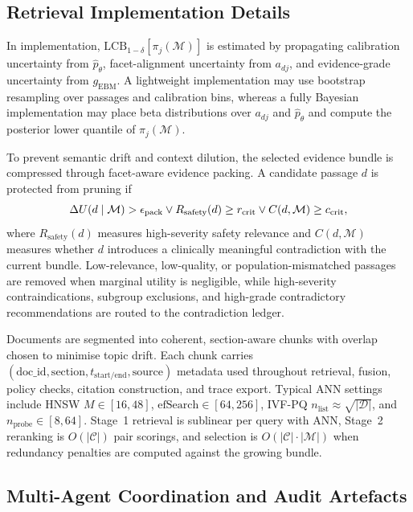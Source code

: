 \documentclass[conference]{IEEEtran}
\begin{document}
\subsection{Retrieval Implementation Details}
\label{app:retrieval-implementation}

In implementation, $\mathrm{LCB}_{1-\delta}[\pi_j(\mathcal{M})]$ is estimated by propagating calibration uncertainty from $\widehat{p}_\theta$, facet-alignment uncertainty from $a_{dj}$, and evidence-grade uncertainty from $g_{\mathrm{EBM}}$. A lightweight implementation may use bootstrap resampling over passages and calibration bins, whereas a fully Bayesian implementation may place beta distributions over $a_{dj}$ and $\widehat{p}_\theta$ and compute the posterior lower quantile of $\pi_j(\mathcal{M})$.

To prevent semantic drift and context dilution, the selected evidence bundle is compressed through facet-aware evidence packing. A candidate passage $d$ is protected from pruning if
\begin{equation}
\scriptsize
\label{eq:protected-pruning}
\small
\Delta U(d\mid\mathcal{M})>\epsilon_{\mathrm{pack}}
\lor
R_{\mathrm{safety}}(d)\ge r_{\mathrm{crit}}
\lor
C(d,\mathcal{M})\ge c_{\mathrm{crit}},
\end{equation}
where $R_{\mathrm{safety}}(d)$ measures high-severity safety relevance and $C(d,\mathcal{M})$ measures whether $d$ introduces a clinically meaningful contradiction with the current bundle. Low-relevance, low-quality, or population-mismatched passages are removed when marginal utility is negligible, while high-severity contraindications, subgroup exclusions, and high-grade contradictory recommendations are routed to the contradiction ledger.

Documents are segmented into coherent, section-aware chunks with overlap chosen to minimise topic drift. Each chunk carries $(\mathrm{doc\_id},\mathrm{section},t_{\mathrm{start/end}},\mathrm{source})$ metadata used throughout retrieval, fusion, policy checks, citation construction, and trace export. Typical ANN settings include HNSW $M\!\in\![16,48]$, $\mathrm{efSearch}\!\in\![64,256]$, IVF-PQ $n_{\mathrm{list}}\!\approx\!\sqrt{|\mathcal{D}|}$, and $n_{\mathrm{probe}}\!\in\![8,64]$. Stage~1 retrieval is sublinear per query with ANN, Stage~2 reranking is $O(|\mathcal{C}|)$ pair scorings, and selection is $O(|\mathcal{C}|\cdot|\mathcal{M}|)$ when redundancy penalties are computed against the growing bundle.


\subsection{Multi-Agent Coordination and Audit Artefacts}
\label{app:agent-artifacts}
\end{document}
